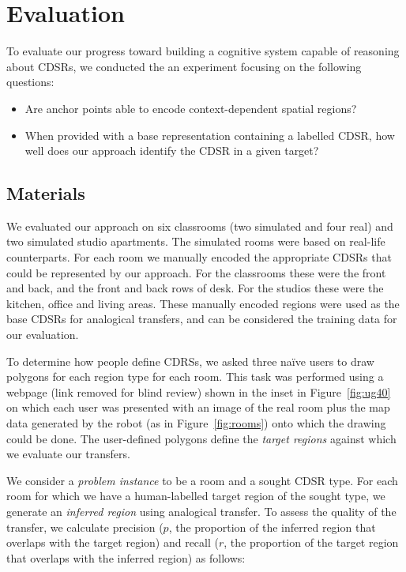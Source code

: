 \section{Evaluation}\label{sec:evaluation}

To evaluate our progress toward building a cognitive system capable of reasoning about CDSRs, we conducted the an experiment focusing on the following questions:
\begin{itemize}
\item{Are anchor points able to encode context-dependent spatial regions?}
\item{When provided with a base representation containing a labelled CDSR, how well does our approach identify the CDSR in a given target?}
\end{itemize}

\subsection{Materials}

We evaluated our approach on six classrooms (two simulated and four real) and two simulated studio apartments. The simulated rooms were based on real-life counterparts. For each room we manually encoded the appropriate CDSRs that could be represented by our approach. For the classrooms these were the front and back, and the front and back rows of desk. For the studios these were the kitchen, office and living areas. These manually encoded regions were used as the base CDSRs for analogical transfers, and can be considered the training data for our evaluation. 

To determine how people define CDRSs, we asked three na\"ive users to draw polygons for each region type for each room. This task was performed using a webpage (link removed for blind review) shown in the inset in Figure~\ref{fig:ug40} on which each user was presented with an image of the real room plus the map data generated by the robot (as in Figure~\ref{fig:rooms}) onto which the drawing could be done. The user-defined polygons define the \textit{target regions} against which we evaluate our transfers.

We consider a \textit{problem instance} to be a room and a sought CDSR type. For each room for which we have a human-labelled target region of the sought type, we generate an \textit{inferred region} using analogical transfer. To assess the quality of the transfer, we calculate precision ($p$, the proportion of the inferred region that overlaps with the target region) and recall ($r$, the proportion of the target region that overlaps with the inferred region) as follows:

